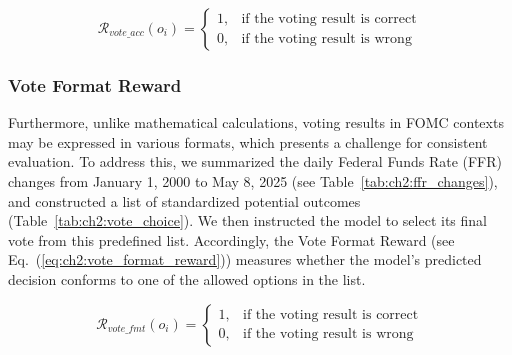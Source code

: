 \begin{equation}\label{eq:ch2:vote_acc_reward}
    \mathcal{R}_{vote\_acc}(o_i) = 
    \begin{cases}
        1, & \text{if the voting result is correct} \\
        0, & \text{if the voting result is wrong}
    \end{cases}
\end{equation}




\subsubsection*{Vote Format Reward}

Furthermore, unlike mathematical calculations, voting results in FOMC contexts may be expressed in various formats, which presents a challenge for consistent evaluation. To address this, we summarized the daily Federal Funds Rate (FFR) changes from January 1, 2000 to May 8, 2025 (see Table~\ref{tab:ch2:ffr_changes}), and constructed a list of standardized potential outcomes (Table~\ref{tab:ch2:vote_choice}). We then instructed the model to select its final vote from this predefined list. Accordingly, the Vote Format Reward (see Eq.~(\ref{eq:ch2:vote_format_reward})) measures whether the model’s predicted decision conforms to one of the allowed options in the list.

\begin{equation}\label{eq:ch2:vote_format_reward}
    \mathcal{R}_{vote\_fmt}(o_i) = 
    \begin{cases}
        1, & \text{if the voting result is correct} \\
        0, & \text{if the voting result is wrong}
    \end{cases}
\end{equation}



